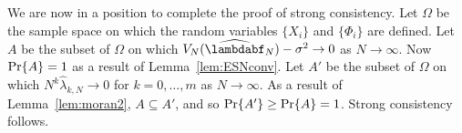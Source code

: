\documentclass[journal]{IEEEtran}
\begin{document}
We are now in a position to complete the proof of strong consistency.  Let $\Omega$ be the sample space on which the random variables $\{X_i\}$ and $\{\Phi_i\}$ are defined.  Let $A$ be the subset of $\Omega$ on which  $V_N(\widehat{\lambdabf}_N) - \sigma^2 \rightarrow 0$ as $N\rightarrow\infty$.  Now $\operatorname{Pr}\{A\} =1$ as a result of Lemma~\ref{lem:ESNconv}.  Let $A'$ be the subset of $\Omega$ on which $N^k\widehat{\lambda}_{k,N} \rightarrow 0$ for $k=0,\dots,m$ as $N\rightarrow\infty$.  As a result of Lemma~\ref{lem:moran2}, $A \subseteq A'$, and so $\operatorname{Pr}\{A'\} \geq \operatorname{Pr}\{A\} = 1$.  Strong consistency follows.

\end{document}
